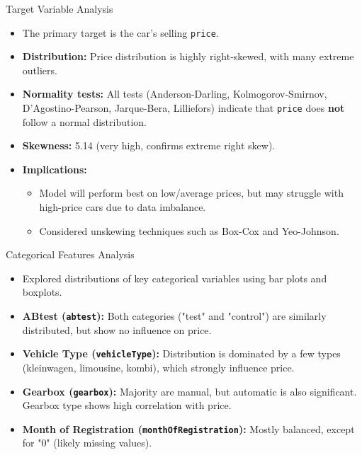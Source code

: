 \documentclass{beamer}
\begin{document}
\begin{frame}{Target Variable Analysis}
    \begin{itemize}
        \item The primary target is the car's selling \texttt{price}.
        \item \textbf{Distribution:} Price distribution is highly right-skewed, with many extreme outliers.
        \item \textbf{Normality tests:} All tests (Anderson-Darling, Kolmogorov-Smirnov, D’Agostino-Pearson, Jarque-Bera, Lilliefors) indicate that \texttt{price} does \textbf{not} follow a normal distribution.
        \item \textbf{Skewness:} 5.14 (very high, confirms extreme right skew).
        \item \textbf{Implications:}
            \begin{itemize}
                \item Model will perform best on low/average prices, but may struggle with high-price cars due to data imbalance.
                \item Considered unskewing techniques such as Box-Cox and Yeo-Johnson.
            \end{itemize}
    \end{itemize}
\end{frame}


\begin{frame}{Categorical Features Analysis}
    \begin{itemize}
        \item Explored distributions of key categorical variables using bar plots and boxplots.
        \item \textbf{ABtest (\texttt{abtest}):} Both categories ("test" and "control") are similarly distributed, but show no influence on price.
        \item \textbf{Vehicle Type (\texttt{vehicleType}):} Distribution is dominated by a few types (kleinwagen, limousine, kombi), which strongly influence price.
        \item \textbf{Gearbox (\texttt{gearbox}):} Majority are manual, but automatic is also significant. Gearbox type shows high correlation with price.
        \item \textbf{Month of Registration (\texttt{monthOfRegistration}):} Mostly balanced, except for "0" (likely missing values).
    \end{itemize}
\end{frame}
\end{document}
